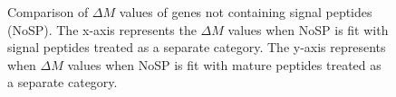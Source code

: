 \documentclass[11pt]{labbook}
\begin{document}
\begin{figure}[H]
\caption{Comparison of $\Delta\mathit{M}$ values of genes not containing signal peptides (NoSP). The x-axis represents the $\Delta\mathit{M}$ values when NoSP is fit with signal peptides treated as a separate category. The y-axis represents when $\Delta\mathit{M}$ values when NoSP is fit with mature peptides treated as a separate category.}
\end{figure}
\end{document}
